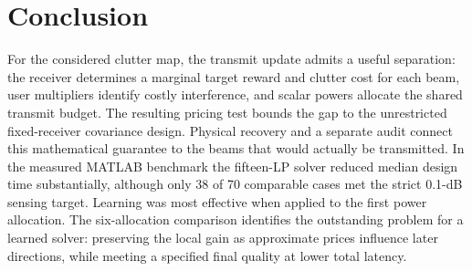 \documentclass[journal]{IEEEtran}
\begin{document}
\section{Conclusion}
For the considered clutter map, the transmit update admits a useful separation: the receiver determines a marginal target reward and clutter cost for each beam, user multipliers identify costly interference, and scalar powers allocate the shared transmit budget. The resulting pricing test bounds the gap to the unrestricted fixed-receiver covariance design. Physical recovery and a separate audit connect this mathematical guarantee to the beams that would actually be transmitted. In the measured MATLAB benchmark the fifteen-LP solver reduced median design time substantially, although only 38 of 70 comparable cases met the strict 0.1-dB sensing target. Learning was most effective when applied to the first power allocation. The six-allocation comparison identifies the outstanding problem for a learned solver: preserving the local gain as approximate prices influence later directions, while meeting a specified final quality at lower total latency.



\end{document}
